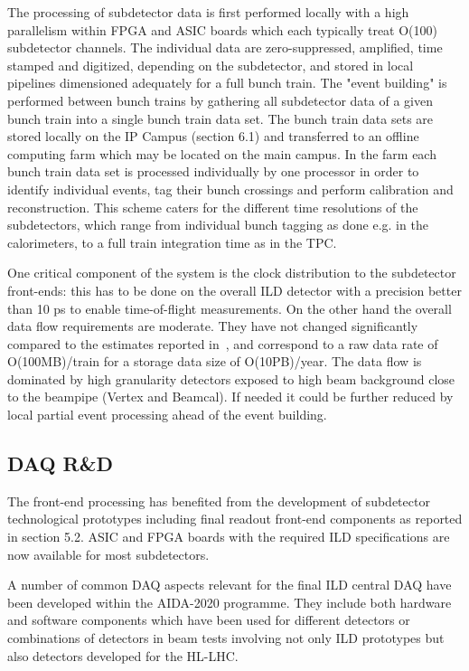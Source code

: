 The processing of subdetector data is first performed locally with a high parallelism within FPGA and ASIC boards which each typically treat O(100) subdetector channels. The individual data are zero-suppressed, amplified, time stamped and digitized, depending on the subdetector, and stored in local pipelines dimensioned adequately for a full bunch train. The "event building" is performed between bunch trains by gathering all subdetector data of a given bunch train into a single bunch train data set. The bunch train data sets are stored locally on the IP Campus (section 6.1) and transferred to an offline computing farm which may be located on the main campus. In the farm each bunch train data set is processed individually by one processor in order to identify individual events, tag their bunch crossings and perform calibration and reconstruction. This scheme caters for the different time resolutions of the subdetectors, which range from individual bunch tagging as done e.g. in the calorimeters, to a full train integration time as in the TPC.

One critical component of the system is the clock distribution to the subdetector front-ends: this has to be done on the overall ILD detector with a precision better than 10 ps to enable time-of-flight measurements. On the other hand the overall data flow requirements are moderate. They have not changed significantly compared to the estimates reported in~\cite{ild:bib:ILDDBD}, and correspond to a raw data rate of O(100MB)/train for a storage data size of O(10PB)/year. The data flow is dominated by high granularity detectors exposed to high beam background close to the beampipe (Vertex and Beamcal). If needed it could be further reduced by local partial event processing ahead of the event building.

\subsection{DAQ R\&D}

The front-end processing has benefited from the development of subdetector technological prototypes including final readout front-end components as reported in section 5.2. ASIC and FPGA boards with the required ILD specifications are now available for most subdetectors.

A number of common DAQ aspects relevant for the final ILD central DAQ have been developed \cite{ild:bib:AIDADAQ} within the AIDA-2020 programme. They include both hardware and software components which have been used for different detectors or combinations of detectors in beam tests involving not only ILD prototypes but also detectors developed for the HL-LHC. 

